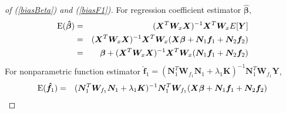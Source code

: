 \documentclass[article,lineno]{biometrika}
\begin{document}
\begin{proof} [of (\ref{biasBeta}) and (\ref{biasF1})]
For regression coefficient estimator $\boldsymbol {\hat \beta}$,
\begin{eqnarray*}
{\rm E}(\boldsymbol {\hat \beta}) 
&=& 
(\boldsymbol X^T  \boldsymbol W_x \boldsymbol X )^{-1} \boldsymbol X^T  \boldsymbol W_x 
E [ \boldsymbol Y] \\
&=&
(\boldsymbol X^T  \boldsymbol W_x \boldsymbol X )^{-1} \boldsymbol X^T  \boldsymbol W_x 
(\boldsymbol X \boldsymbol \beta +
 \boldsymbol N_{1} \boldsymbol f_1 + 
  \boldsymbol N_{2} \boldsymbol f_2) \\ 
&=&
 \boldsymbol \beta 
+ (\boldsymbol X^T  \boldsymbol W_x \boldsymbol X )^{-1} \boldsymbol X^T  \boldsymbol W_x   (\boldsymbol N_{1} \boldsymbol f_1 + 
  \boldsymbol N_{2} \boldsymbol f_2)
\end{eqnarray*}
For nonparametric function estimator 
$
\boldsymbol {\hat f}_1
 =
  (\boldsymbol N_1^T 
\boldsymbol W_{f_1}  \boldsymbol N_1
  + \lambda_1 \boldsymbol K)^{-1}  \boldsymbol N_1^T \boldsymbol W_{f_1} \boldsymbol Y
$,
\begin{eqnarray*}
    {\rm E}(\boldsymbol {\hat f}_1) 
&=&
(\boldsymbol N_1^T 
\boldsymbol W_{f_1}  \boldsymbol N_1
  + \lambda_1 \boldsymbol K)^{-1}  \boldsymbol N_1^T \boldsymbol W_{f_1}
(\boldsymbol X \boldsymbol \beta + \boldsymbol N_{1} \boldsymbol f_1 + 
  \boldsymbol N_{2} \boldsymbol f_2) \\ 

\end{eqnarray*}
\end{proof}
\end{document}
